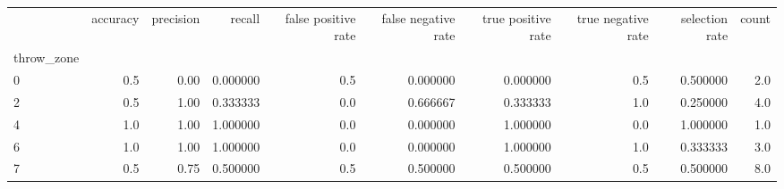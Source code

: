 \begin{tabular}{lrrrrrrrrr}
\toprule
{} &  accuracy &  precision &    recall &  false positive rate &  false negative rate &  true positive rate &  true negative rate &  selection rate &  count \\
throw\_zone &           &            &           &                      &                      &                     &                     &                 &        \\
\midrule
0          &       0.5 &       0.00 &  0.000000 &                  0.5 &             0.000000 &            0.000000 &                 0.5 &        0.500000 &    2.0 \\
2          &       0.5 &       1.00 &  0.333333 &                  0.0 &             0.666667 &            0.333333 &                 1.0 &        0.250000 &    4.0 \\
4          &       1.0 &       1.00 &  1.000000 &                  0.0 &             0.000000 &            1.000000 &                 0.0 &        1.000000 &    1.0 \\
6          &       1.0 &       1.00 &  1.000000 &                  0.0 &             0.000000 &            1.000000 &                 1.0 &        0.333333 &    3.0 \\
7          &       0.5 &       0.75 &  0.500000 &                  0.5 &             0.500000 &            0.500000 &                 0.5 &        0.500000 &    8.0 \\
\bottomrule
\end{tabular}

